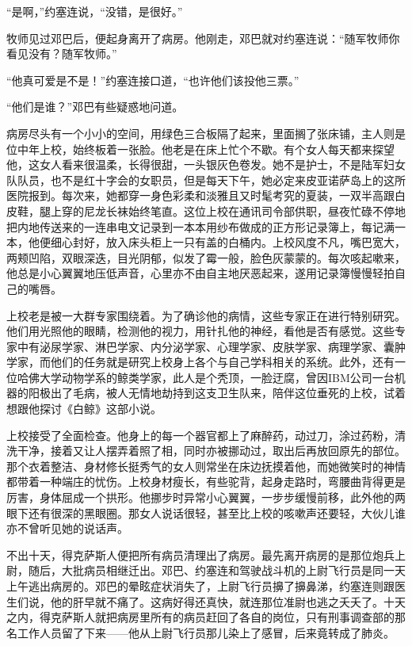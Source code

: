 “是啊，”约塞连说，“没错，是很好。”

牧师见过邓巴后，便起身离开了病房。他刚走，邓巴就对约塞连说：“随军牧师你看见没有？随军牧师。”

“他真可爱是不是！”约塞连接口道，“也许他们该投他三票。”

“他们是谁？”邓巴有些疑惑地问道。

病房尽头有一个小小的空间，用绿色三合板隔了起来，里面搁了张床铺，主人则是位中年上校，始终板着一张脸。他老是在床上忙个不歇。有个女人每天都来探望他，这女人看来很温柔，长得很甜，一头银灰色卷发。她不是护士，不是陆军妇女队队员，也不是红十字会的女职员，但是每天下午，她必定来皮亚诺萨岛上的这所医院报到。每次来，她都穿一身色彩柔和淡雅且又时髦考究的夏装，一双半高跟白皮鞋，腿上穿的尼龙长袜始终笔直。这位上校在通讯司令部供职，昼夜忙碌不停地把内地传送来的一连串电文记录到一本本用纱布做成的正方形记录簿上，每记满一本，他便细心封好，放入床头柜上一只有盖的白桶内。上校风度不凡，嘴巴宽大，两颊凹陷，双眼深迭，目光阴郁，似发了霉一般，脸色灰蒙蒙的。每次咳起嗽来，他总是小心翼翼地压低声音，心里亦不由自主地厌恶起来，遂用记录簿慢慢轻拍自己的嘴唇。

上校老是被一大群专家围绕着。为了确诊他的病情，这些专家正在进行特别研究。他们用光照他的眼睛，检测他的视力，用针扎他的神经，看他是否有感觉。这些专家中有泌尿学家、淋巴学家、内分泌学家、心理学家、皮肤学家、病理学家、囊肿学家，而他们的任务就是研究上校身上各个与自己学科相关的系统。此外，还有一位哈佛大学动物学系的鲸类学家，此人是个秃顶，一脸迂腐，曾因IBM公司一台机器的阳极出了毛病，被人无情地劫持到这支卫生队来，陪伴这位垂死的上校，试着想跟他探讨《白鲸》这部小说。

上校接受了全面检查。他身上的每一个器官都上了麻醉药，动过刀，涂过药粉，清洗干净，接着又让人摆弄着照了相，同时亦被挪动过，取出后再放回原先的部位。那个衣着整洁、身材修长挺秀气的女人则常坐在床边抚摸着他，而她微笑时的神情都带着一种端庄的忧伤。上校身材瘦长，有些驼背，起身走路时，弯腰曲背得更是厉害，身体屈成一个拱形。他挪步时异常小心翼翼，一步步缓慢前移，此外他的两眼下还有很深的黑眼圈。那女人说话很轻，甚至比上校的咳嗽声还要轻，大伙儿谁亦不曾听见她的说话声。

不出十天，得克萨斯人便把所有病员清理出了病房。最先离开病房的是那位炮兵上尉，随后，大批病员相继迁出。邓巴、约塞连和驾驶战斗机的上尉飞行员是同一天上午逃出病房的。邓巴的晕眩症状消失了，上尉飞行员擤了擤鼻涕，约塞连则跟医生们说，他的肝早就不痛了。这病好得还真快，就连那位准尉也逃之夭夭了。十天之内，得克萨斯人就把病房里所有的病员赶回了各自的岗位，只有刑事调查部的那名工作人员留了下来——他从上尉飞行员那儿染上了感冒，后来竟转成了肺炎。
